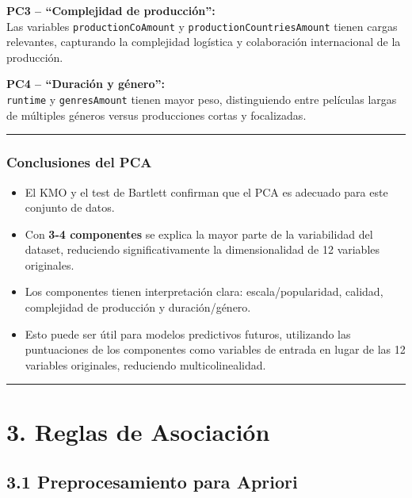 \documentclass[
]{article}
\providecommand{\tightlist}{%
  \setlength{\itemsep}{0pt}\setlength{\parskip}{0pt}}
\begin{document}
\textbf{PC3 -- ``Complejidad de producción'':}\\
Las variables \texttt{productionCoAmount} y
\texttt{productionCountriesAmount} tienen cargas relevantes, capturando
la complejidad logística y colaboración internacional de la producción.

\textbf{PC4 -- ``Duración y género'':}\\
\texttt{runtime} y \texttt{genresAmount} tienen mayor peso,
distinguiendo entre películas largas de múltiples géneros versus
producciones cortas y focalizadas.

\begin{center}\rule{0.5\linewidth}{0.5pt}\end{center}

\subsubsection{Conclusiones del PCA}\label{conclusiones-del-pca}

\begin{itemize}
\tightlist
\item
  El KMO y el test de Bartlett confirman que el PCA es adecuado para
  este conjunto de datos.
\item
  Con \textbf{3-4 componentes} se explica la mayor parte de la
  variabilidad del dataset, reduciendo significativamente la
  dimensionalidad de 12 variables originales.
\item
  Los componentes tienen interpretación clara: escala/popularidad,
  calidad, complejidad de producción y duración/género.
\item
  Esto puede ser útil para modelos predictivos futuros, utilizando las
  puntuaciones de los componentes como variables de entrada en lugar de
  las 12 variables originales, reduciendo multicolinealidad.
\end{itemize}

\begin{center}\rule{0.5\linewidth}{0.5pt}\end{center}

\section{3. Reglas de Asociación}\label{reglas-de-asociaciuxf3n}

\subsection{3.1 Preprocesamiento para
Apriori}\label{preprocesamiento-para-apriori}
\end{document}
